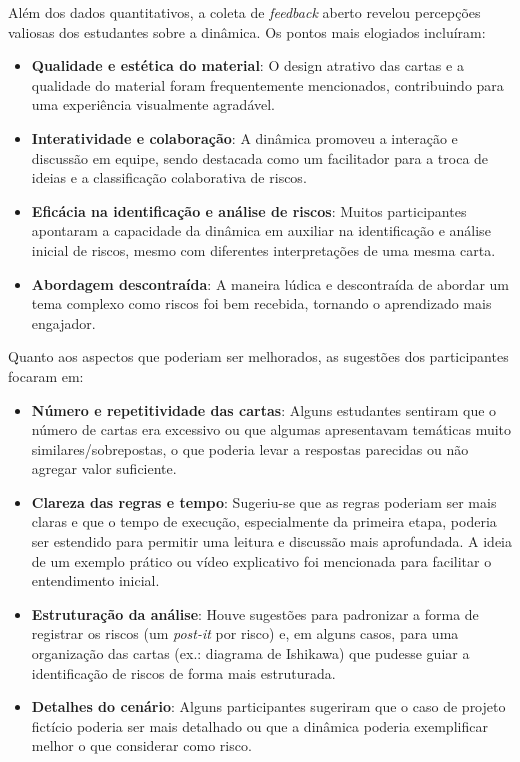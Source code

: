 \documentclass[
	12pt,
	openright,
	twoside,
	a4paper,
	english,
	brazil
	]{abntex2}
\begin{document}
Além dos dados quantitativos, a coleta de \textit{feedback} aberto revelou percepções valiosas dos estudantes sobre a dinâmica. Os pontos mais elogiados incluíram:
\begin{itemize}
  \item \textbf{Qualidade e estética do material}: O design atrativo das cartas e a qualidade do material foram frequentemente mencionados, contribuindo para uma experiência visualmente agradável.
  \item \textbf{Interatividade e colaboração}: A dinâmica promoveu a interação e discussão em equipe, sendo destacada como um facilitador para a troca de ideias e a classificação colaborativa de riscos.
  \item \textbf{Eficácia na identificação e análise de riscos}: Muitos participantes apontaram a capacidade da dinâmica em auxiliar na identificação e análise inicial de riscos, mesmo com diferentes interpretações de uma mesma carta.
  \item \textbf{Abordagem descontraída}: A maneira lúdica e descontraída de abordar um tema complexo como riscos foi bem recebida, tornando o aprendizado mais engajador.
\end{itemize}

Quanto aos aspectos que poderiam ser melhorados, as sugestões dos participantes focaram em:
\begin{itemize}
  \item \textbf{Número e repetitividade das cartas}: Alguns estudantes sentiram que o número de cartas era excessivo ou que algumas apresentavam temáticas muito similares/sobrepostas, o que poderia levar a respostas parecidas ou não agregar valor suficiente.
  \item \textbf{Clareza das regras e tempo}: Sugeriu-se que as regras poderiam ser mais claras e que o tempo de execução, especialmente da primeira etapa, poderia ser estendido para permitir uma leitura e discussão mais aprofundada. A ideia de um exemplo prático ou vídeo explicativo foi mencionada para facilitar o entendimento inicial.
  \item \textbf{Estruturação da análise}: Houve sugestões para padronizar a forma de registrar os riscos (um \textit{post-it} por risco) e, em alguns casos, para uma organização das cartas (ex.: diagrama de Ishikawa) que pudesse guiar a identificação de riscos de forma mais estruturada.
  \item \textbf{Detalhes do cenário}: Alguns participantes sugeriram que o caso de projeto fictício poderia ser mais detalhado ou que a dinâmica poderia exemplificar melhor o que considerar como risco.
\end{itemize}
\end{document}

